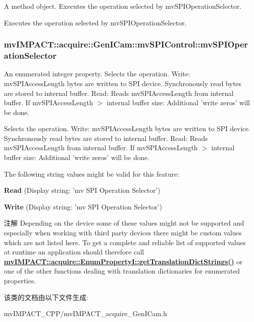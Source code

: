 A method object. Executes the operation selected by mv\+S\+P\+I\+Operation\+Selector. 

Executes the operation selected by mv\+S\+P\+I\+Operation\+Selector. \hypertarget{classmv_i_m_p_a_c_t_1_1acquire_1_1_gen_i_cam_1_1mv_s_p_i_control_acd7ac08de101ff82313c9f99066a18b9}{
\subsubsection[{mv\+S\+P\+I\+Operation\+Selector}]{ mv\+I\+M\+P\+A\+C\+T\+::acquire\+::\+Gen\+I\+Cam\+::mv\+S\+P\+I\+Control\+::mv\+S\+P\+I\+Operation\+Selector}}\label{classmv_i_m_p_a_c_t_1_1acquire_1_1_gen_i_cam_1_1mv_s_p_i_control_acd7ac08de101ff82313c9f99066a18b9}


An enumerated integer property. Selects the operation. Write\+: mv\+S\+P\+I\+Access\+Length bytes are written to S\+P\+I device. Synchronously read bytes are stored to internal buffer. Read\+: Reads mv\+S\+P\+I\+Access\+Length from internal buffer. If mv\+S\+P\+I\+Access\+Length $>$ internal buffer size\+: Additional 'write zeros' will be done. 

Selects the operation. Write\+: mv\+S\+P\+I\+Access\+Length bytes are written to S\+P\+I device. Synchronously read bytes are stored to internal buffer. Read\+: Reads mv\+S\+P\+I\+Access\+Length from internal buffer. If mv\+S\+P\+I\+Access\+Length $>$ internal buffer size\+: Additional 'write zeros' will be done.

The following string values might be valid for this feature\+:
\begin{DoxyItemize}
\item {\bfseries Read} (Display string\+: 'mv S\+P\+I Operation Selector')
\item {\bfseries Write} (Display string\+: 'mv S\+P\+I Operation Selector')
\end{DoxyItemize}

\begin{DoxyNote}{注解}
Depending on the device some of these values might not be supported and especially when working with third party devices there might be custom values which are not listed here. To get a complete and reliable list of supported values at runtime an application should therefore call {\bfseries \hyperlink{classmv_i_m_p_a_c_t_1_1acquire_1_1_enum_property_i_a0ba6ccbf5ee69784d5d0b537924d26b6}{mv\+I\+M\+P\+A\+C\+T\+::acquire\+::\+Enum\+Property\+I\+::get\+Translation\+Dict\+Strings()}} or one of the other functions dealing with translation dictionaries for enumerated properties. 
\end{DoxyNote}


该类的文档由以下文件生成\+:\begin{DoxyCompactItemize}
\item 
mv\+I\+M\+P\+A\+C\+T\+\_\+\+C\+P\+P/mv\+I\+M\+P\+A\+C\+T\+\_\+acquire\+\_\+\+Gen\+I\+Cam.\+h\end{DoxyCompactItemize}
